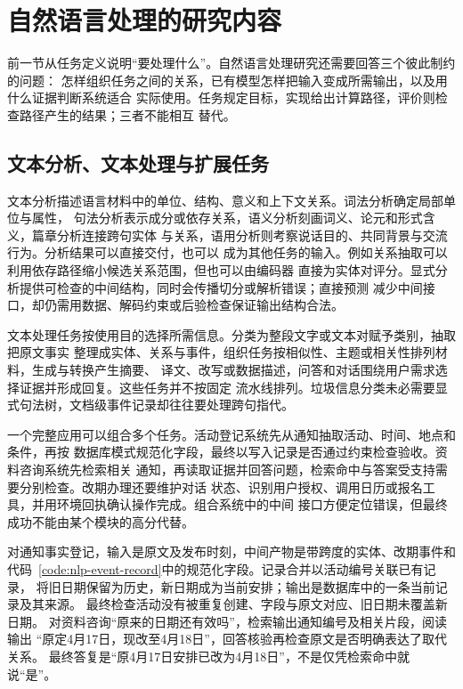 \section{自然语言处理的研究内容}
\label{sec:nlp-research-content}

前一节从任务定义说明“要处理什么”。自然语言处理研究还需要回答三个彼此制约的问题：
怎样组织任务之间的关系，已有模型怎样把输入变成所需输出，以及用什么证据判断系统适合
实际使用。任务规定目标，实现给出计算路径，评价则检查路径产生的结果；三者不能相互
替代。

\subsection{文本分析、文本处理与扩展任务}
\label{sec:nlp-analysis-processing-extended}

文本分析描述语言材料中的单位、结构、意义和上下文关系。词法分析确定局部单位与属性，
句法分析表示成分或依存关系，语义分析刻画词义、论元和形式含义，篇章分析连接跨句实体
与关系，语用分析则考察说话目的、共同背景与交流行为。分析结果可以直接交付，也可以
成为其他任务的输入。例如关系抽取可以利用依存路径缩小候选关系范围，但也可以由编码器
直接为实体对评分。显式分析提供可检查的中间结构，同时会传播切分或解析错误；直接预测
减少中间接口，却仍需用数据、解码约束或后验检查保证输出结构合法。

文本处理任务按使用目的选择所需信息。分类为整段文字或文本对赋予类别，抽取把原文事实
整理成实体、关系与事件，组织任务按相似性、主题或相关性排列材料，生成与转换产生摘要、
译文、改写或数据描述，问答和对话围绕用户需求选择证据并形成回复。这些任务并不按固定
流水线排列。垃圾信息分类未必需要显式句法树，文档级事件记录却往往要处理跨句指代。

一个完整应用可以组合多个任务。活动登记系统先从通知抽取活动、时间、地点和条件，再按
数据库模式规范化字段，最终以写入记录是否通过约束检查验收。资料咨询系统先检索相关
通知，再读取证据并回答问题，检索命中与答案受支持需要分别检查。改期办理还要维护对话
状态、识别用户授权、调用日历或报名工具，并用环境回执确认操作完成。组合系统中的中间
接口方便定位错误，但最终成功不能由某个模块的高分代替。

对通知事实登记，输入是原文及发布时刻，中间产物是带跨度的实体、改期事件和
代码~\ref{code:nlp-event-record}中的规范化字段。记录合并以活动编号关联已有记录，
将旧日期保留为历史，新日期成为当前安排；输出是数据库中的一条当前记录及其来源。
最终检查活动没有被重复创建、字段与原文对应、旧日期未覆盖新日期。
对资料咨询“原来的日期还有效吗”，检索输出通知编号及相关片段，阅读输出
“原定4月17日，现改至4月18日”，回答核验再检查原文是否明确表达了取代关系。
最终答复是“原4月17日安排已改为4月18日”，不是仅凭检索命中就说“是”。

